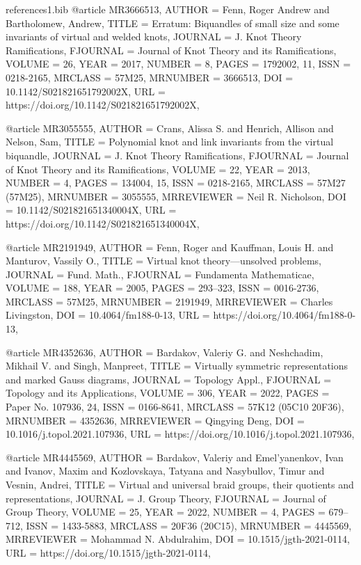 \documentclass[11pt, reqno]{amsart}
\theoremstyle{definition}
\begin{document}
\begin{filecontents*}[overwrite]{references1.bib}
@article {MR3666513,
	AUTHOR = {Fenn, Roger Andrew and Bartholomew, Andrew},
	TITLE = {Erratum: {B}iquandles of small size and some invariants of
		virtual and welded knots},
	JOURNAL = {J. Knot Theory Ramifications},
	FJOURNAL = {Journal of Knot Theory and its Ramifications},
	VOLUME = {26},
	YEAR = {2017},
	NUMBER = {8},
	PAGES = {1792002, 11},
	ISSN = {0218-2165},
	MRCLASS = {57M25},
	MRNUMBER = {3666513},
	DOI = {10.1142/S021821651792002X},
	URL = {https://doi.org/10.1142/S021821651792002X},
}

@article {MR3055555,
	AUTHOR = {Crans, Alissa S. and Henrich, Allison and Nelson, Sam},
	TITLE = {Polynomial knot and link invariants from the virtual
		biquandle},
	JOURNAL = {J. Knot Theory Ramifications},
	FJOURNAL = {Journal of Knot Theory and its Ramifications},
	VOLUME = {22},
	YEAR = {2013},
	NUMBER = {4},
	PAGES = {134004, 15},
	ISSN = {0218-2165},
	MRCLASS = {57M27 (57M25)},
	MRNUMBER = {3055555},
	MRREVIEWER = {Neil R. Nicholson},
	DOI = {10.1142/S021821651340004X},
	URL = {https://doi.org/10.1142/S021821651340004X},
}

@article {MR2191949,
	AUTHOR = {Fenn, Roger and Kauffman, Louis H. and Manturov, Vassily O.},
	TITLE = {Virtual knot theory---unsolved problems},
	JOURNAL = {Fund. Math.},
	FJOURNAL = {Fundamenta Mathematicae},
	VOLUME = {188},
	YEAR = {2005},
	PAGES = {293--323},
	ISSN = {0016-2736},
	MRCLASS = {57M25},
	MRNUMBER = {2191949},
	MRREVIEWER = {Charles Livingston},
	DOI = {10.4064/fm188-0-13},
	URL = {https://doi.org/10.4064/fm188-0-13},
}

@article {MR4352636,
	AUTHOR = {Bardakov, Valeriy G. and Neshchadim, Mikhail V. and Singh,
		Manpreet},
	TITLE = {Virtually symmetric representations and marked {G}auss
		diagrams},
	JOURNAL = {Topology Appl.},
	FJOURNAL = {Topology and its Applications},
	VOLUME = {306},
	YEAR = {2022},
	PAGES = {Paper No. 107936, 24},
	ISSN = {0166-8641},
	MRCLASS = {57K12 (05C10 20F36)},
	MRNUMBER = {4352636},
	MRREVIEWER = {Qingying Deng},
	DOI = {10.1016/j.topol.2021.107936},
	URL = {https://doi.org/10.1016/j.topol.2021.107936},
}

@article {MR4445569,
	AUTHOR = {Bardakov, Valeriy and Emel'yanenkov, Ivan and Ivanov, Maxim
		and Kozlovskaya, Tatyana and Nasybullov, Timur and Vesnin,
		Andrei},
	TITLE = {Virtual and universal braid groups, their quotients and
		representations},
	JOURNAL = {J. Group Theory},
	FJOURNAL = {Journal of Group Theory},
	VOLUME = {25},
	YEAR = {2022},
	NUMBER = {4},
	PAGES = {679--712},
	ISSN = {1433-5883},
	MRCLASS = {20F36 (20C15)},
	MRNUMBER = {4445569},
	MRREVIEWER = {Mohammad N. Abdulrahim},
	DOI = {10.1515/jgth-2021-0114},
	URL = {https://doi.org/10.1515/jgth-2021-0114},
}


\end{filecontents*}
\end{document}
